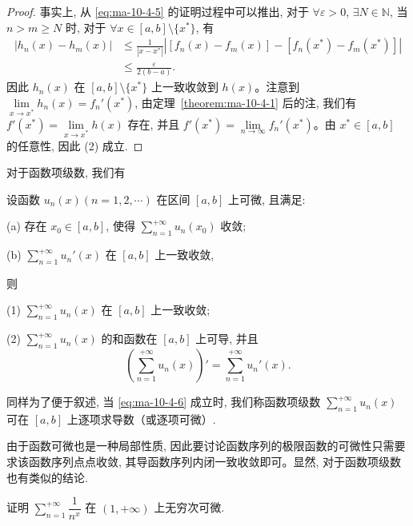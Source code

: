 \begin{proof}
事实上, 从 \eqref{eq:ma-10-4-5} 的证明过程中可以推出, 对于 $\forall\varepsilon>0$, $\exists N\in\mathbb N$, 当 $n>m\geq N$ 时, 对于 $\forall x\in[a,b]\setminus\{x^*\}$, 有
\[
\begin{aligned}
  |h_n(x)-h_m(x)|
  &\leq \frac1{|x-x^*|}\left|[f_n(x)-f_m(x)]-[f_n(x^*)-f_m(x^*)]\right|\\
  &\leq\frac{\varepsilon}{2(b-a)}.
\end{aligned}
\]
因此 $h_n(x)$ 在 $[a,b]\setminus\{x^*\}$ 上一致收敛到 $h(x)$。注意到 $\lim\limits_{x\to x^*}h_n(x)=f_n'(x^*)$, 由定理~\ref{theorem:ma-10-4-1} 后的注, 我们有 $f'(x^*)=\lim\limits_{x\to x^*}h(x)$ 存在, 并且 $f'(x^*)=\lim\limits_{n\to\infty}f_n'(x^*)$。由 $x^*\in[a,b]$ 的任意性, 因此 (2) 成立.
\end{proof}


对于函数项级数, 我们有

\begin{theorem}\label{theorem:ma-10-4-4-prime}
设函数 $u_n(x)(n=1,2,\cdots)$ 在区间 $[a,b]$ 上可微, 且满足:

(a) 存在 $x_0\in[a,b]$, 使得 $\sum\limits_{n=1}^{+\infty}u_n(x_0)$ 收敛;

(b) $\sum\limits_{n=1}^{+\infty}u_n'(x)$ 在 $[a,b]$ 上一致收敛,

则

(1) $\sum\limits_{n=1}^{+\infty}u_n(x)$ 在 $[a,b]$ 上一致收敛;

(2) $\sum\limits_{n=1}^{+\infty}u_n(x)$ 的和函数在 $[a,b]$ 上可导, 并且
\begin{equation}
  \left(\sum_{n=1}^{+\infty}u_n(x)\right)'
  =\sum_{n=1}^{+\infty}u_n'(x).
  \label{eq:ma-10-4-6}
\end{equation}
\end{theorem}

同样为了便于叙述, 当 \eqref{eq:ma-10-4-6} 成立时, 我们称函数项级数 $\sum\limits_{n=1}^{+\infty}u_n(x)$ 可在 $[a,b]$ 上逐项求导数（或逐项可微）.

\begin{remark}\label{remark:ma-10-source-70}
由于函数可微也是一种局部性质, 因此要讨论函数序列的极限函数的可微性只需要求该函数序列点点收敛, 其导函数序列内闭一致收敛即可。显然, 对于函数项级数也有类似的结论.
\end{remark}


\begin{example}\label{example:ma-10-4-5}
证明 $\sum\limits_{n=1}^{+\infty}\dfrac1{n^x}$ 在 $(1,+\infty)$ 上无穷次可微.
\end{example}


